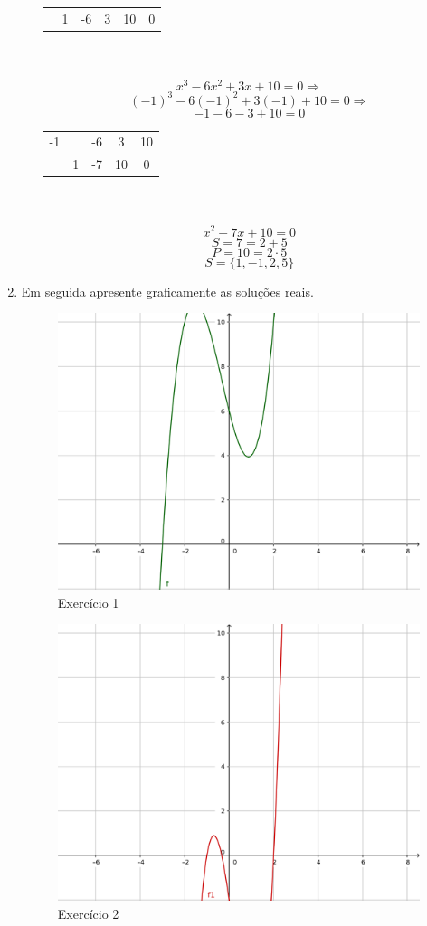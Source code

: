 \documentclass[a4paper, 12pt]{article}
\begin{document}
\begin{enumerate}
\begin{enumerate}
\begin{tabular}{c c c c c c}
      & 1 & -6 & 3 & 10 & 0 \\    
    \end{tabular}\\\\
    $$x^3-6x^2+3x+10=0 \Rightarrow $$
    $$(-1)^3-6(-1)^2+3(-1)+10=0 \Rightarrow $$
    $$-1-6-3+10=0$$
    \centering
    \begin{tabular}{c c c c c}
    -1 & \textbar 1 & -6 & 3 & 10 \\
      & 1 & -7 & 10 & 0 \\    
    \end{tabular}\\\\
    $$x^2-7x+10=0$$
    $$S=7=2+5$$
    $$P=10=2\cdot5$$
    $$\boxed{S=\{1,-1,2,5\}}$$
    
    
    
  \end{enumerate}
\item Em seguida apresente graficamente as soluções reais. \\
    \begin{figure}[h!]
    \centering
    \includegraphics[width=120mm]{img1.png}
    \caption{Exercício 1}
    \end{figure}

    \begin{figure}[h!]
    \centering
    \includegraphics[width=120mm]{img2.png}
    \caption{Exercício 2}
    \end{figure}


\end{enumerate}
\end{document}
